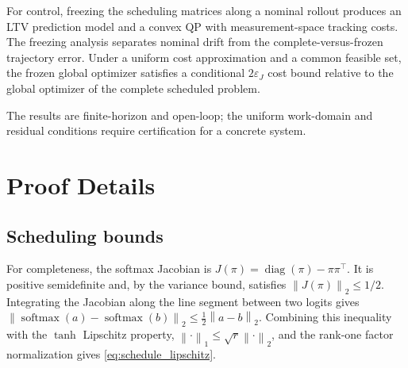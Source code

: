 \documentclass[journal]{IEEEtran}
\newcommand{\norm}[1]{\left\lVert #1\right\rVert}
\begin{document}
For control, freezing the scheduling matrices along a nominal rollout produces an LTV prediction model and a convex QP with measurement-space tracking costs. The freezing analysis separates nominal drift from the complete-versus-frozen trajectory error. Under a uniform cost approximation and a common feasible set, the frozen global optimizer satisfies a conditional $2\varepsilon_J$ cost bound relative to the global optimizer of the complete scheduled problem.

The results are finite-horizon and open-loop; the uniform work-domain and residual conditions require certification for a concrete system.

\appendices
\section{Proof Details}
\label{app:proofs}

\subsection*{Scheduling bounds}
For completeness, the softmax Jacobian is $J(\pi)=\operatorname{diag}(\pi)-\pi\pi^\top$. It is positive semidefinite and, by the variance bound, satisfies $\norm{J(\pi)}_2\le1/2$. Integrating the Jacobian along the line segment between two logits gives $\norm{\operatorname{softmax}(a)-\operatorname{softmax}(b)}_2\le\frac12\norm{a-b}_2$. Combining this inequality with the $\tanh$ Lipschitz property, $\norm{\cdot}_1\le\sqrt r\norm{\cdot}_2$, and the rank-one factor normalization gives \eqref{eq:schedule_lipschitz}.
\end{document}
